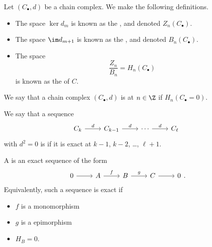 \documentclass[main.tex]{subfiles}
\begin{document}
\begin{definition}
  \label{def:cycle_boundary_homology}
  Let $(C_{\bullet}, d)$ be a chain complex. We make the following definitions.
  \begin{itemize}
    \item The space $\ker d_{m}$ is known as the , and denoted $Z_{n}(C_{\bullet})$.

    \item The space $\im d_{m+1}$ is known as the , and denoted $B_{n}(C_{\bullet})$.

    \item The space 
      \begin{equation*}
        \frac{Z_{n}}{B_{n}} = H_{n}(C_{\bullet})
      \end{equation*}
      is known as the  of $C$.
  \end{itemize}
\end{definition}

\begin{definition}[exact]
  \label{def:exact}
  We say that a chain complex $(C_{\bullet}, d)$ is  at $n \in \Z$ if $H_{n}(C_{\bullet} = 0)$.
\end{definition}

\begin{definition}
  \label{def:exact_sequence}
  We say that a sequence
  \begin{equation*}
    \begin{tikzcd}
      C_{k}
      \arrow[r, "d"]
      & C_{k-1}
      \arrow[r, "d"]
      & \cdots
      \arrow[r, "d"]
      & C_{\ell}
    \end{tikzcd}
  \end{equation*}
  with $d^{2} = 0$ is  if it is exact at $k-1$, $k-2$, \dots, $\ell + 1$.
\end{definition}

\begin{definition}
  \label{def:short_exact_sequence}
  A  is an exact sequence of the form
  \begin{equation*}
    \begin{tikzcd}
      0
      \arrow[r]
      & A
      \arrow[r, "f"]
      & B
      \arrow[r, "g"]
      & C
      \arrow[r]
      & 0
    \end{tikzcd}.
  \end{equation*}
  Equivalently, such a sequence is exact if
  \begin{itemize}
    \item $f$ is a monomorphism

    \item $g$ is a epimorphism

    \item $H_{B} = 0$.
  \end{itemize}
\end{definition}
\end{document}
